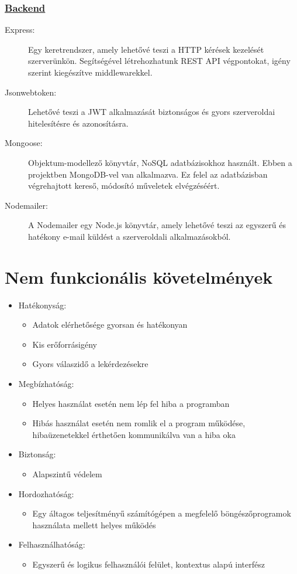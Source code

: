\subsubsection{\underline{Backend}}
\begin{description}
	\item[Express: \cite{express}] Egy keretrendszer, amely lehetővé teszi a HTTP kérések kezelését szerverünkön. Segítségével létrehozhatunk REST API végpontokat, igény szerint kiegészítve middlewarekkel.
	\item[Jsonwebtoken: \cite{jsonwebtoken}] Lehetővé teszi a JWT alkalmazását biztonságos és gyors szerveroldai hitelesítésre és azonosításra.
	\item[Mongoose: \cite{mongoose}] Objektum-modellező könyvtár, NoSQL adatbázisokhoz használt. Ebben a projektben MongoDB-vel van alkalmazva. Ez felel az adatbázisban végrehajtott kereső, módosító műveletek elvégzéséért.
	\item[Nodemailer: \cite{nodemailer}] A Nodemailer egy Node.js könyvtár, amely lehetővé teszi az egyszerű és hatékony e-mail küldést a szerveroldali alkalmazásokból.
\end{description}

\pagebreak

\section{Nem funkcionális követelmények}

\begin{itemize}
	\item Hatékonyság: 
	\begin{itemize}
		\item Adatok elérhetősége gyorsan és hatékonyan
		\item Kis erőforrásigény
		\item Gyors válaszidő a lekérdezésekre
	\end{itemize}
	\item Megbízhatóság:
	\begin{itemize}
		\item Helyes használat esetén nem lép fel hiba a programban
		\item Hibás használat esetén nem romlik el a program működése, hibaüzenetekkel érthetően kommunikálva van a hiba oka
	\end{itemize}
	\item Biztonság:
	\begin{itemize}
		\item Alapszintű védelem
	\end{itemize}	
	\item Hordozhatóság:
	\begin{itemize}
		\item Egy áltagos teljesítményű számítógépen a megfelelő böngészőprogramok használata mellett helyes működés
	\end{itemize}
	\item Felhasználhatóság:
	\begin{itemize}
		\item Egyszerű és logikus felhasználói felület, kontextus alapú interfész
	\end{itemize}
\end{itemize}

